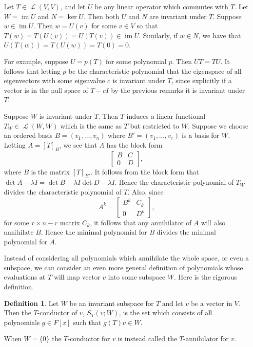 \documentclass[12pt]{article}
\theoremstyle{plain}
\theoremstyle{definition}
\newtheorem{defn}{Definition}
\newcommand{\Lop}{\operatorname{\mathcal{L}}}
\newcommand{\im}{\operatorname{im}}
\begin{document}
Let $T \in \Lop(V, V)$, and let $U$ be any linear operator which commutes with $T$. Let $W = \im{U}$ and $N = \ker{U}$. Then both $U$ and $N$ are invariant under $T$. Suppose $w \in \im{U}$. Then $w = U(v)$ for some $v \in V$ so that $T(w) = T(U(v)) = U(T(v)) \in \im{U}$. Similarly, if $w \in N$, we have that $U(T(w)) = T(U(w)) = T(0) = 0$.

For example, suppose $U = p(T)$ for some polynomial $p$. Then $UT = TU$. It follows that letting $p$ be the characteristic polynomial that the eigenspace of all eigenvectors with some eigenvalue $c$ is invariant under $T$, since explicitly if a vector is in the null space of $T - cI$ by the previous remarks it is invariant under $T$.

Suppose $W$ is invariant under $T$. Then $T$ induces a linear functional $T_W \in \Lop(W, W)$ which is the same as $T$ but restricted to $W$. Suppose we choose an ordered basis $B = (v_1, \dotsc, v_n)$ where $B' = (v_1, \dotsc, v_r)$ is a basis for $W$. Letting $A = [T]_B$, we see that $A$ has the block form 
\[\begin{bmatrix}B & C \\ 0 & D \end{bmatrix},\]
where $B$ is the matrix $[T]_{B'}$. It follows from the block form that $\det{A - \lambda I} = \det{B - \lambda I}\det{D - \lambda I}$. Hence the characteristic polynomial of $T_W$ divides the characteristic polynomial of $T$. Also, since 
\[A^k = \begin{bmatrix}B^k & C_k \\ 0 & D^k \end{bmatrix},\] for some $r \times n - r$ matrix $C_k$, it follows that any annihilator of $A$ will also annihilate $B$. Hence the minimal polynomial for $B$ divides the minimal polynomial for $A$.

Instead of considering all polynomials which annihilate the whole space, or even a subspace, we can consider an even more general definition of polynomials whose evaluations at $T$ will map vector $v$ into some subspace $W$. Here is the rigorous definition.

\begin{defn}
Let $W$ be an invariant subspace for $T$ and let $v$ be a vector in $V$. Then the $T$-conductor of $v$, $S_T(v; W)$, is the set which consists of all polynomials $g \in F[x]$ such that $g(T)v \in W$. 
\end{defn}

When $W = \{0\}$ the $T$-conductor for $v$ is instead called the $T$-annihilator for $v$.
\end{document}
